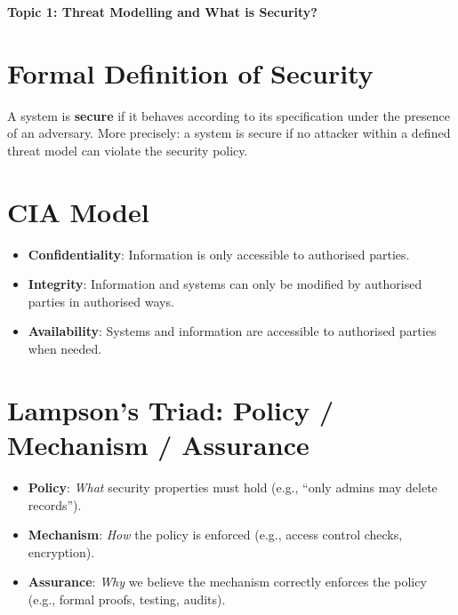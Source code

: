 \documentclass[10pt,a4paper]{article}
\begin{document}
\begin{center}
    \textbf{\large Topic 1: Threat Modelling and What is Security?}
\end{center}

\section*{Formal Definition of Security}
A system is \textbf{secure} if it behaves according to its specification under the presence of an adversary. More precisely: a system is secure if no attacker within a defined threat model can violate the security policy.

\section*{CIA Model}
\begin{itemize}
    \item \textbf{Confidentiality}: Information is only accessible to authorised parties.
    \item \textbf{Integrity}: Information and systems can only be modified by authorised parties in authorised ways.
    \item \textbf{Availability}: Systems and information are accessible to authorised parties when needed.
\end{itemize}

\section*{Lampson's Triad: Policy / Mechanism / Assurance}
\begin{itemize}
    \item \textbf{Policy}: \emph{What} security properties must hold (e.g., ``only admins may delete records'').
    \item \textbf{Mechanism}: \emph{How} the policy is enforced (e.g., access control checks, encryption).
    \item \textbf{Assurance}: \emph{Why} we believe the mechanism correctly enforces the policy (e.g., formal proofs, testing, audits).
\end{itemize}
\end{document}
